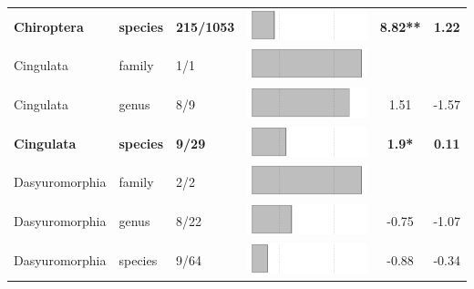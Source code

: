 \begin{longtable}{lL{1.8cm}C{2cm}lcc}
  \textbf{Chiroptera} & \textbf{species} & \textbf{215/1053} & \includegraphics[width=0.20\linewidth, height=0.05\linewidth]{Supplementaries/Figures/Chapter2/Results_1c/Table_figures/bar12.pdf} & \textbf{8.82**} & \textbf{1.22} \\ 
  Cingulata & family & 1/1 & \includegraphics[width=0.20\linewidth, height=0.05\linewidth]{Supplementaries/Figures/Chapter2/Results_1c/Table_figures/bar13.pdf} &   &   \\ 
  Cingulata & genus & 8/9 & \includegraphics[width=0.20\linewidth, height=0.05\linewidth]{Supplementaries/Figures/Chapter2/Results_1c/Table_figures/bar14.pdf} & 1.51 & -1.57 \\ 
  \textbf{Cingulata} & \textbf{species} & \textbf{9/29} & \includegraphics[width=0.20\linewidth, height=0.05\linewidth]{Supplementaries/Figures/Chapter2/Results_1c/Table_figures/bar15.pdf} & \textbf{1.9*} & \textbf{0.11} \\ 
  Dasyuromorphia & family & 2/2 & \includegraphics[width=0.20\linewidth, height=0.05\linewidth]{Supplementaries/Figures/Chapter2/Results_1c/Table_figures/bar16.pdf} &   &   \\ 
  Dasyuromorphia & genus & 8/22 & \includegraphics[width=0.20\linewidth, height=0.05\linewidth]{Supplementaries/Figures/Chapter2/Results_1c/Table_figures/bar17.pdf} & -0.75 & -1.07 \\ 
  Dasyuromorphia & species & 9/64 & \includegraphics[width=0.20\linewidth, height=0.05\linewidth]{Supplementaries/Figures/Chapter2/Results_1c/Table_figures/bar18.pdf} & -0.88 & -0.34 \\ 

\end{longtable}
